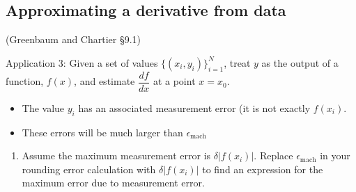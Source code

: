 \documentclass[12pt,letterpaper,noanswers]{exam}
\begin{document}
\subsection*{Approximating a derivative from data}
\begin{tcolorbox}
(Greenbaum and Chartier \S 9.1)

Application 3: Given a set of values $\{(x_i,y_i)\}_{i=1}^N$, treat $y$ as the output of a function, $f(x)$, and estimate $\dfrac{df}{dx}$ at a point $x = x_0$.
\begin{itemize}
\itemsep0pt
    \item The value $y_i$ has an associated measurement error (it is not exactly $f(x_i)$.
    \item These errors will be much larger than $\epsilon_{\text{mach}}$
\end{itemize}
\end{tcolorbox}
\begin{enumerate}[resume=classQ]
\item Assume the maximum measurement error is $\delta \vert f(x_i)\vert$.  Replace $\epsilon_{\text{mach}}$ in your rounding error calculation with $\delta \vert f(x_i)\vert$ to find an expression for the maximum error due to measurement error.

\vspace{1in}


\end{enumerate}
\end{document}

